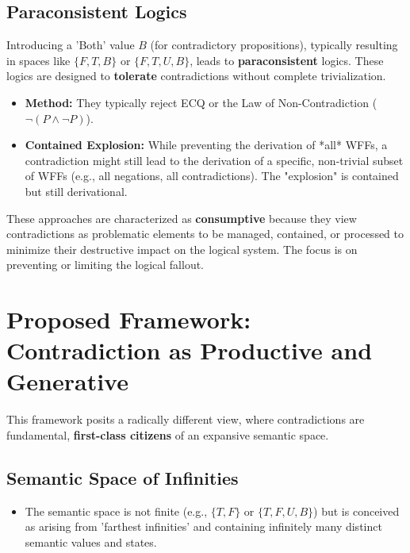 	\subsection{Paraconsistent Logics}
	Introducing a 'Both' value $B$ (for contradictory propositions), typically resulting in spaces like $\{F, T, B\}$ or $\{F, T, U, B\}$, leads to \textbf{paraconsistent} logics. These logics are designed to \textbf{tolerate} contradictions without complete trivialization.
	\begin{itemize}
		\item \textbf{Method:} They typically reject ECQ or the Law of Non-Contradiction ($\neg(P \land \neg P)$).
		\item \textbf{Contained Explosion:} While preventing the derivation of *all* WFFs, a contradiction might still lead to the derivation of a specific, non-trivial subset of WFFs (e.g., all negations, all contradictions). The "explosion" is contained but still derivational.
	\end{itemize}
	
	These approaches are characterized as \textbf{consumptive} because they view contradictions as problematic elements to be managed, contained, or processed to minimize their destructive impact on the logical system. The focus is on preventing or limiting the logical fallout.
	
	\section{Proposed Framework: Contradiction as Productive and Generative}
	
	This framework posits a radically different view, where contradictions are fundamental, \textbf{first-class citizens} of an expansive semantic space.
	
	\subsection{Semantic Space of Infinities}
	\begin{itemize}
		\item The semantic space is not finite (e.g., $\{T, F\}$ or $\{T, F, U, B\}$) but is conceived as arising from 'farthest infinities' and containing infinitely many distinct semantic values and states.
	\end{itemize}
	
